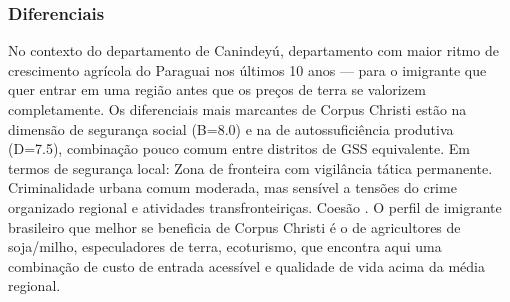 \subsubsection*{Diferenciais}\label{dif-corpus-christi-1402}
No contexto do departamento de Canindeyú, departamento com maior ritmo de crescimento agrícola do Paraguai nos últimos 10 anos — para o imigrante que quer entrar em uma região antes que os preços de terra se valorizem completamente. Os diferenciais mais marcantes de Corpus Christi estão na dimensão de segurança social (B=8.0) e na de autossuficiência produtiva (D=7.5), combinação pouco comum entre distritos de GSS equivalente. Em termos de segurança local: Zona de fronteira com vigilância tática permanente. Criminalidade urbana comum moderada, mas sensível a tensões do crime organizado regional e atividades transfronteiriças. Coesão . O perfil de imigrante brasileiro que melhor se beneficia de Corpus Christi é o de agricultores de soja/milho, especuladores de terra, ecoturismo, que encontra aqui uma combinação de custo de entrada acessível e qualidade de vida acima da média regional.
